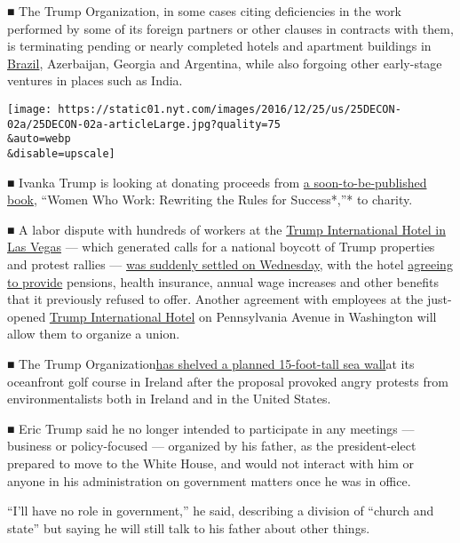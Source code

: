 ■ The Trump Organization, in some cases citing deficiencies in the work
performed by some of its foreign partners or other clauses in contracts
with them, is terminating pending or nearly completed hotels and
apartment buildings in
\href{http://www.nytimes.com/2016/12/14/world/americas/donald-trump-hotel-rio-brazil-investigation.html}{Brazil},
Azerbaijan, Georgia and Argentina, while also forgoing other early-stage
ventures in places such as India.

\texttt{[image: https://static01.nyt.com/images/2016/12/25/us/25DECON-02a/25DECON-02a-articleLarge.jpg?quality=75\\\&auto=webp\\\&disable=upscale]}

■ Ivanka Trump is looking at donating proceeds from
\href{https://www.amazon.com/Women-Who-Work-Rewriting-Success/dp/0735211329}{a
soon-to-be-published book}, ``Women Who Work: Rewriting the Rules for
Success*,''* to charity.

■ A labor dispute with hundreds of workers at the
\href{https://www.trumphotels.com/las-vegas}{Trump International Hotel
in Las Vegas} --- which generated calls for a national boycott of Trump
properties and protest rallies ---
\href{http://www.nytimes.com/2016/12/21/business/economy/trump-organization-labor-unions-hotels.html}{was
suddenly settled on Wednesday}, with the hotel
\href{http://www.nytimes.com/2016/12/21/business/economy/trump-organization-labor-unions-hotels.html}{agreeing
to provide} pensions, health insurance, annual wage increases and other
benefits that it previously refused to offer. Another agreement with
employees at the just-opened
\href{https://www.trumphotels.com/washington-dc}{Trump International
Hotel} on Pennsylvania Avenue in Washington will allow them to organize
a union.

■ The Trump
Organization\href{http://www.nytimes.com/2016/12/07/business/international/britain-ireland-trump-golf-snail.html}{has
shelved a planned 15-foot-tall sea wall}at its oceanfront golf course in
Ireland after the proposal provoked angry protests from
environmentalists both in Ireland and in the United States.

■ Eric Trump said he no longer intended to participate in any meetings
--- business or policy-focused --- organized by his father, as the
president-elect prepared to move to the White House, and would not
interact with him or anyone in his administration on government matters
once he was in office.

``I'll have no role in government,'' he said, describing a division of
``church and state'' but saying he will still talk to his father about
other things.

